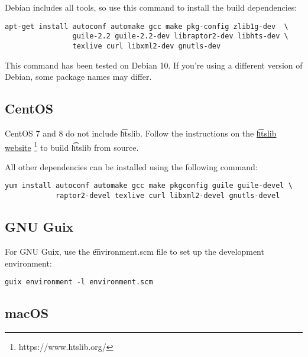   Debian includes all tools, so use this command to install the
  build dependencies:

\begin{siderules}
\begin{verbatim}
apt-get install autoconf automake gcc make pkg-config zlib1g-dev  \
                guile-2.2 guile-2.2-dev libraptor2-dev libhts-dev \
                texlive curl libxml2-dev gnutls-dev
\end{verbatim}
\end{siderules}

  This command has been tested on Debian 10.  If you're using a different
  version of Debian, some package names may differ.

\subsection{CentOS}

  CentOS 7 and 8 do not include \t{htslib}.  Follow the instructions on
  the \href{https://www.htslib.org/}{\t{htslib} website}%
  \footnote{https://www.htslib.org/} to build \t{htslib} from source.

  All other dependencies can be installed using the following command:

\begin{siderules}
\begin{verbatim}
yum install autoconf automake gcc make pkgconfig guile guile-devel \
            raptor2-devel texlive curl libxml2-devel gnutls-devel
\end{verbatim}
\end{siderules}

\subsection{GNU Guix}

  For GNU Guix, use the \t{environment.scm} file to set up the development
  environment:

\begin{siderules}
\begin{verbatim}
guix environment -l environment.scm
\end{verbatim}
\end{siderules}

\subsection{macOS}

